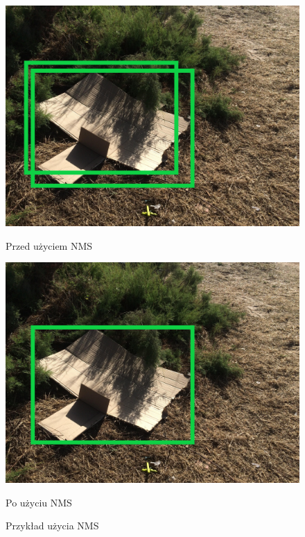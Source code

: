 \documentclass[licencjacka]{pracamgr}
\begin{document}
\begin{figure}[h]
    \centering
    \begin{minipage}{0.45\textwidth}
        \centering
        \includegraphics[width=\linewidth]{not000050.jpg}
        \caption{Przed użyciem NMS}
        \label{fig:not}
    \end{minipage}
    \hfill
    \begin{minipage}{0.45\textwidth}
        \centering
        \includegraphics[width=\linewidth]{good000050.jpg}
        \caption{Po użyciu NMS}
        \label{fig:good}
    \end{minipage}
    \caption{Przykład użycia NMS}
\end{figure}
\end{document}
